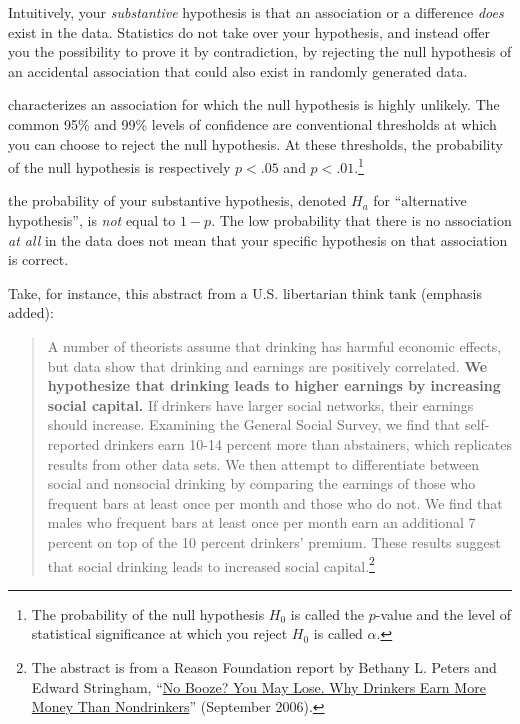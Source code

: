 Intuitively, your \emph{substantive} hypothesis is that an association or a difference \emph{does} exist in the data. Statistics do not take over your hypothesis, and instead offer you the possibility to prove it by contradiction, by rejecting the null hypothesis of an accidental association that could also exist in randomly generated data.

 characterizes an association for which the null hypothesis is highly unlikely. The common 95\% and 99\% levels of confidence are conventional thresholds at which you can choose to reject the null hypothesis. At these thresholds, the probability of the null hypothesis is respectively $p < .05$ and $p < .01$.\footnote{The probability of the null hypothesis $H_0$ is called the $p$-value and the level of statistical significance at which you reject $H_0$ is called $\alpha$.}

 the probability of your substantive hypothesis, denoted $H_a$ for ``alternative hypothesis'', is \emph{not} equal to $1 - p$. The low probability that there is no association \emph{at all} in the data does not mean that your specific hypothesis on that association is correct.

Take, for instance, this abstract from a U.S. libertarian think tank (emphasis added):

\begin{quote}
A number of theorists assume that drinking has harmful economic effects, but data show that drinking and earnings are positively correlated. \textbf{We hypothesize that drinking leads to higher earnings by increasing social capital.} If drinkers have larger social networks, their earnings should increase. Examining the General Social Survey, we find that self-reported drinkers earn 10-14 percent more than abstainers, which replicates results from other data sets. We then attempt to differentiate between social and nonsocial drinking by comparing the earnings of those who frequent bars at least once per month and those who do not. We find that males who frequent bars at least once per month earn an additional 7 percent on top of the 10 percent drinkers' premium. These results suggest that social drinking leads to increased social capital.\footnote{The abstract is from a Reason Foundation report by Bethany L. Peters and Edward Stringham, ``\href{http://reason.org/news/show/127594.html}{No Booze? You May Lose. Why Drinkers Earn More Money Than Nondrinkers}'' (September 2006).}
\end{quote}

